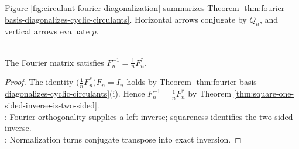 Figure \ref{fig:circulant-fourier-diagonalization} summarizes Theorem \ref{thm:fourier-basis-diagonalizes-cyclic-circulants}. Horizontal arrows conjugate by $Q_n$, and vertical arrows evaluate $p$.

\begin{illustrationfigure}[H]
  
  \caption{Fourier conjugation commutes with polynomial evaluation: $P_n$ maps to $\Omega_n$ and $C=p(P_n)$ to $p(\Omega_n)$.}
  \label{fig:circulant-fourier-diagonalization}
\end{illustrationfigure}

\begin{proposition} \label{prop:fourier-matrix-inverse} \\
The Fourier matrix satisfies $F_n^{-1}=\frac{1}{n}F_n^*$.
\begin{proof}
The identity $\bigl(\frac{1}{n}F_n^*\bigr)F_n=I_n$ holds by Theorem \ref{thm:fourier-basis-diagonalizes-cyclic-circulants}(i). Hence $F_n^{-1}=\frac{1}{n}F_n^*$ by Theorem \ref{thm:square-one-sided-inverse-is-two-sided}.\\
: Fourier orthogonality supplies a left inverse; squareness identifies the two-sided inverse.\\
: Normalization turns conjugate transpose into exact inversion.
\end{proof}
\end{proposition}
